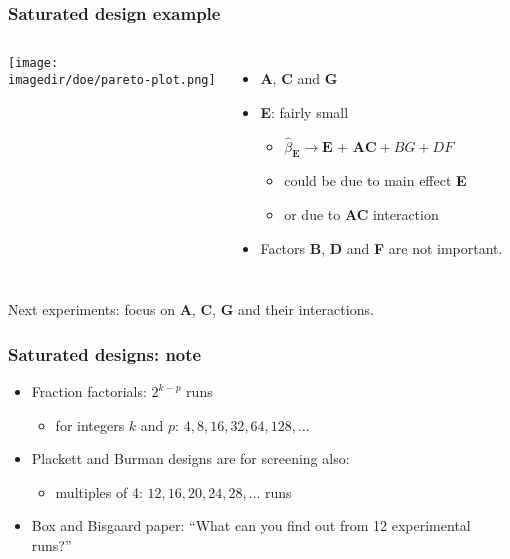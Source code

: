 \begin{frame}\frametitle{Saturated design example}
	\begin{columns}
		\column{4cm} 
			\begin{center}
				\texttt{[image: \\imagedir/doe/pareto-plot.png]} 
			\end{center}
		\column{6cm} 
			\begin{itemize}
				\item	\textbf{A}, \textbf{C} and \textbf{G} 
				\item	\textbf{E}: fairly small 
				\begin{itemize}
					\item	$\widehat{\beta}_{\mathbf{E}} \rightarrow \textbf{E + AC} + BG + DF$ 
					\item	could be due to main effect \textbf{E} 
					\item	or due to \textbf{AC} interaction 
				\end{itemize}
				\item	Factors \textbf{B}, \textbf{D} and \textbf{F} are not important.
			\end{itemize}
	\end{columns}
	\vspace{12pt}
	Next experiments: focus on \textbf{A}, \textbf{C}, \textbf{G} and their interactions.
\end{frame}

\begin{frame}\frametitle{Saturated designs: note}
	\begin{itemize}
		\item	Fraction factorials: $2^{k-p}$ runs
		\begin{itemize}
			\item	for integers $k$ and $p$: $4, 8, 16, 32, 64, 128, \ldots$
		\end{itemize}
		\item	Plackett and Burman designs are for screening also:
		\begin{itemize}
			\item	multiples of 4: $12, 16, 20, 24, 28, \ldots$ runs
		\end{itemize}
		\item	Box and Bisgaard paper: ``What can you find out from 12 experimental runs?''
	\end{itemize}
\end{frame}

